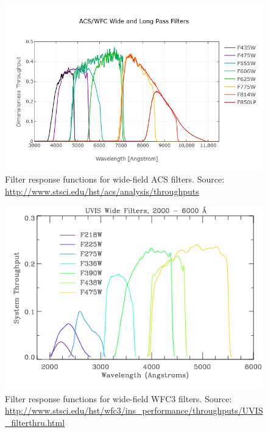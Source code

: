 \documentclass[12pt, a4paper]{report}
\begin{document}
\begin{figure}[h]
\begin{center}
\includegraphics[width=1.0\textwidth]{ACS_Wide.png}
\caption{Filter response functions for wide-field ACS filters. Source: \protect\url{http://www.stsci.edu/hst/acs/analysis/throughputs}}
\label{ACS_response_funcs}
\end{center}
\end{figure}

\begin{figure}[h!]
\begin{center}
\includegraphics[width=1.0\textwidth]{UVIS_Wide1.jpg}
\caption{Filter response functions for wide-field WFC3 filters. Source: \protect\url{http://www.stsci.edu/hst/wfc3/ins_performance/throughputs/UVIS_filterthru.html}}
\label{WFC3_response_funcs1}
\end{center}
\end{figure}
\end{document}
